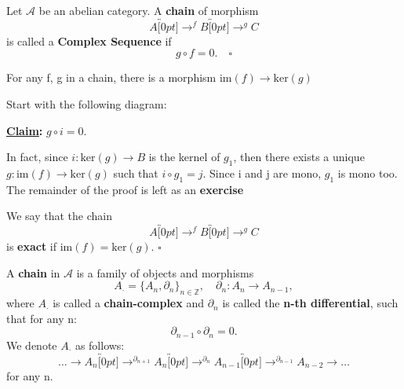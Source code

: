 \documentclass[../category_theory.tex]{subfiles}
\begin{document}
\begin{def*}
	Let \(\mathcal{A}\) be an abelian category. A \textbf{chain} of morphism
	\[
		A \overbracket[0pt]{\longrightarrow}^{f} B \overbracket[0pt]{\longrightarrow}^{g} C
	\]
	is called a \textbf{Complex Sequence} if
	\[
		g\circ f = 0.\quad \square
	\]
\end{def*}
\begin{lemma*}
	For any f, g in a chain, there is a morphism \(\mathrm{im}(f) \rightarrow \mathrm{ker}(g)\)
\end{lemma*}
\begin{proof*}
	Start with the following diagram:
	\begin{center}
	\end{center}
	\textbf{\underline{Claim}:} \(g\circ i = 0\).

	In fact, since \(i:\mathrm{ker}(g)\rightarrow B\) is the kernel of \(g_1\), then there exists a unique \(g:\mathrm{im}(f)\rightarrow \mathrm{ker}(g)\) such that \(i\circ g_{1}=j\). Since i and j are mono, \(g_{1}\) is mono too. The remainder of the proof is left as an \textbf{exercise}
\end{proof*}
\begin{def*}
	We say that the chain
	\[
		A\overbracket[0pt]{\rightarrow}^{f}B\overbracket[0pt]{\rightarrow}^{g}C
	\]
	is \textbf{exact} if \(\mathrm{im}(f) = \mathrm{ker}(g)\). \(\square\)
\end{def*}
\begin{def*}
	A \textbf{chain} in \(\mathcal{A}\) is a family of objects and morphisms
	\[
		A_{\cdot }=\{A_{n}, \partial_{n}\}_{n\in \mathbb{Z}},\quad \partial_{n}:A_{n}\rightarrow A_{n-1},
	\]
	where \(A_{\cdot }\) is called a \textbf{chain-complex} and \(\partial_{n}\) is called the \textbf{n-th differential}, such that for any n:
	\[
		\partial_{n-1}\circ \partial_{n} = 0.
	\]
	We denote \(A_{\cdot }\) as follows:
	\[
		\dotsc \rightarrow A_{n}\overbracket[0pt]{\rightarrow}^{\partial_{n+1}}A_{n}\overbracket[0pt]{\rightarrow}^{\partial_{n}}A_{n-1}\overbracket[0pt]{\rightarrow}^{\partial_{n-1}}A_{n-2}\rightarrow \dotsc
	\]
	for any n.
\end{def*}
\end{document}
